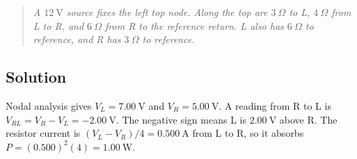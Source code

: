 \documentclass[11pt]{article}
\begin{document}
\begin{quote}\small\textit{A $12\ \mathrm{V}$ source fixes the left top node. Along the top are $3\ \Omega$ to L, $4\ \Omega$ from L to R, and $6\ \Omega$ from R to the reference return. L also has $6\ \Omega$ to reference, and R has $3\ \Omega$ to reference.}\end{quote}

\subsection*{Solution}

Nodal analysis gives $V_L=7.00\ \mathrm{V}$ and $V_R=5.00\ \mathrm{V}$. A reading from R to L is $V_{RL}=V_R-V_L=-2.00\ \mathrm{V}$. The negative sign means L is $2.00\ \mathrm{V}$ above R. The resistor current is $(V_L-V_R)/4=0.500\ \mathrm{A}$ from L to R, so it absorbs $P=(0.500)^2(4)=1.00\ \mathrm{W}$.\par
\end{document}
